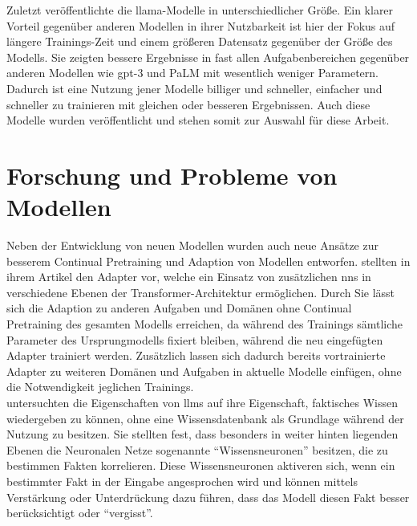 Zuletzt veröffentlichte \citet{llama} die \ac{llama}-Modelle in unterschiedlicher Größe. 
Ein klarer Vorteil gegenüber anderen Modellen in ihrer Nutzbarkeit ist hier der Fokus auf längere Trainings-Zeit und einem größeren Datensatz gegenüber der Größe des Modells. 
Sie zeigten bessere Ergebnisse in fast allen Aufgabenbereichen gegenüber anderen Modellen wie \ac{gpt}-3 und \ac{PaLM} mit wesentlich weniger Parametern. 
Dadurch ist eine Nutzung jener Modelle billiger und schneller, einfacher und schneller zu trainieren mit gleichen oder besseren Ergebnissen. 
Auch diese Modelle wurden veröffentlicht und stehen somit zur Auswahl für diese Arbeit.

\section{Forschung und Probleme von Modellen}
Neben der Entwicklung von neuen Modellen wurden auch neue Ansätze zur besserem Continual Pretraining und Adaption von Modellen entworfen. 
\citet{adapterhub} stellten in ihrem Artikel den Adapter vor, welche ein Einsatz von zusätzlichen \ac{nn}s in verschiedene Ebenen der Transformer-Architektur ermöglichen.
Durch Sie lässt sich die Adaption zu anderen Aufgaben und Domänen ohne Continual Pretraining des gesamten Modells erreichen, da während des Trainings sämtliche Parameter des Ursprungmodells fixiert bleiben, während die neu eingefügten Adapter trainiert werden.
Zusätzlich lassen sich dadurch bereits vortrainierte Adapter zu weiteren Domänen und Aufgaben in aktuelle Modelle einfügen, ohne die Notwendigkeit jeglichen Trainings.\\

\citet{knowledge_neurons} untersuchten die Eigenschaften von \ac{llm}s auf ihre Eigenschaft, faktisches Wissen wiedergeben zu können, ohne eine Wissensdatenbank als Grundlage während der Nutzung zu besitzen.
Sie stellten fest, dass besonders in weiter hinten liegenden Ebenen die Neuronalen Netze sogenannte \enquote{Wissensneuronen} besitzen, die zu bestimmen Fakten korrelieren.
Diese Wissensneuronen aktiveren sich, wenn ein bestimmter Fakt in der Eingabe angesprochen wird und können mittels Verstärkung oder Unterdrückung dazu führen, dass das Modell diesen Fakt besser berücksichtigt oder \enquote{vergisst}.\\

